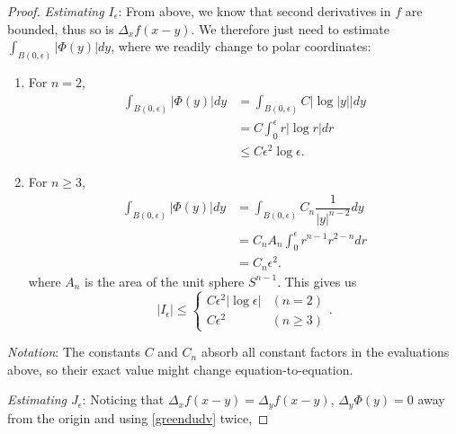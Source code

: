 \documentclass[openany, amssymb, psamsfonts]{amsart}
\theoremstyle{definition}
\numberwithin{equation}{section}
\begin{document}
\begin{proof}
    \textit{Estimating $I_\epsilon$}: From above, we know that second derivatives in $f$ are bounded, thus so is $\Delta_x f(x - y)$. We therefore just need to estimate $\int_{B(0, \epsilon)} |\Phi(y)| dy$, where we readily change to polar coordinates:
    \begin{enumerate}
        \item For $n=2$,
        \begin{align*}
            \int_{B(0, \epsilon)} |\Phi(y)| dy &= \int_{B(0, \epsilon)} C |\log |y||dy \\
            &= C \int_{0}^{\epsilon} r |\log r| dr \\
            &\leq C \epsilon^2 \log \epsilon .
        \end{align*}
        \item For $n \geq 3$, 
\begin{align*}
    \int_{B(0, \epsilon)} |\Phi(y)| dy &= \int_{B(0, \epsilon)} C_n \dfrac{1}{|y|^{n-2}} dy \\
            &= C_n A_n \int_{0}^{\epsilon} r^{n-1} r^{2-n} dr \\
            &= C_n \epsilon^2 .
\end{align*}
where $A_n$ is the area of the unit sphere $S^{n-1}$. This gives us \begin{equation} \label{I_e}
    |I_\epsilon| \leq \begin{cases}
        C\epsilon^2 |\log \epsilon| & (n=2) \\
        C \epsilon^2 & (n \geq 3)
    \end{cases} .
\end{equation}
\end{enumerate}

\textit{Notation}: The constants $C$ and $C_n$ absorb all constant factors in the evaluations above, so their exact value might change equation-to-equation.

\textit{Estimating $J_\epsilon$}: Noticing that $\Delta_x f(x-y) = \Delta_y f(x-y)$, $\Delta_y \Phi(y) = 0$ away from the origin and using \eqref{greendudv} twice,


\end{proof}
\end{document}
